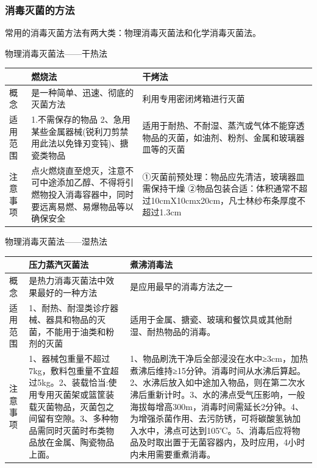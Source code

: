\documentclass[11pt, a4paper]{ctexart}
\begin{document}
\subsubsection{消毒灭菌的方法}
常用的消毒灭菌方法有两大类：物理消毒灭菌法和化学消毒灭菌法。

\begin{tipsbox}{物理消毒灭菌法——干热法}
\begin{tabular}{|p{3cm}|p{5cm}|p{5cm}|}
\hline
 & \textbf{燃烧法} & \textbf{干烤法} \\
\hline
概念 & 是一种简单、迅速、彻底的灭菌方法 & 利用专用密闭烤箱进行灭菌 \\
\hline
适用范围 & 1.不需保存的物品 2、急用某些金属器械(锐利刀剪禁用此法以免锋刃变钝)、搪瓷类物品 & 适用于耐热、不耐湿、蒸汽或气体不能穿透物品的灭菌，如油剂、粉剂、金属和玻璃器皿等的灭菌 \\
\hline
注意事项 & 点火燃烧直至熄灭，注意不可中途添加乙醇、不得将引燃物投入消毒容器中，同时要远离易燃、易爆物品等以确保安全 & ①灭菌前预处理：物品应先清洁，玻璃器皿需保持干燥 ②物品包装合适：体积通常不超过10cmX10cmx20cm，凡士林纱布条厚度不超过1.3cm \\
\hline
\end{tabular}
\end{tipsbox}

\begin{tipsbox}{物理消毒灭菌法——湿热法}
\begin{tabular}{|p{3cm}|p{5cm}|p{5cm}|}
\hline
 & \textbf{压力蒸汽灭菌法} & \textbf{煮沸消毒法} \\
\hline
概念 & 是热力消毒灭菌法中效果最好的一种方法 & 是应用最早的消毒方法之一 \\
\hline
适用范围 & 1、耐热、耐湿类诊疗器械、器具和物品的灭菌，不能用于油类和粉剂的灭菌 & 适用于金属、搪瓷、玻璃和餐饮具或其他耐湿、耐热物品的消毒。 \\
\hline
注意事项 & 1、器械包重量不超过7kg，敷料包重量不宜超过5kg。2、装载恰当:使用专用灭菌架或篮筐装载灭菌物品，灭菌包之间留有空隙。3、多种物品需同时灭菌时布类物品放在金属、陶瓷物品上面。 & 1、物品刷洗干净后全部浸没在水中≥3cm，加热煮沸后维持≥15分钟。消毒时间从水沸后算起。2、水沸后放入如中途加入物品，则在第二次水沸后重新计时。3、水的沸点受气压影响，一般海拔每增高300m，消毒时间需延长2分钟。4、为增强杀菌作用、去污防锈，可将碳酸氢钠加入水中，沸点可达到105℃。5、消毒后应将物品及时取出置于无菌容器内，及时应用，4小时内未用需要重煮消毒。 \\
\hline
\end{tabular}
\end{tipsbox}
\end{document}
